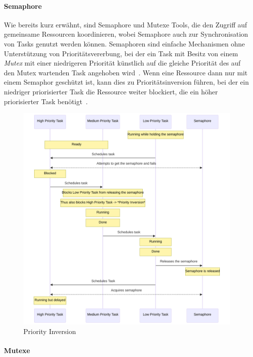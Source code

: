 \paragraph{Semaphore}

Wie bereits kurz erwähnt, sind Semaphore und Mutexe Tools, die den Zugriff auf
gemeinsame Ressourcen koordinieren, wobei Semaphore auch zur Synchronisation von
Tasks genutzt werden können. Semaphoren sind einfache Mechanismen ohne
Unterstützung von Prioritätsvererbung, bei der ein Task mit Besitz von einem
\textit{Mutex} mit einer niedrigeren Priorität künstlich auf die gleiche
Priorität des auf den Mutex wartenden Task angehoben
wird~\cite{wikipedia_priority_inheritance}. Wenn eine Ressource dann nur mit
einem Semaphor geschützt ist, kann dies zu Prioritätsinversion führen, bei der
ein niedriger priorisierter Task die Ressource weiter blockiert, die ein höher
priorisierter Task benötigt~\cite{wikipedia_priority_inversion}.

\begin{figure}[htb]
    \centering
    \includegraphics[width=1\textwidth]{assets/prio_inversion}
    \caption{Priority Inversion}
\end{figure}

\paragraph{Mutexe}

